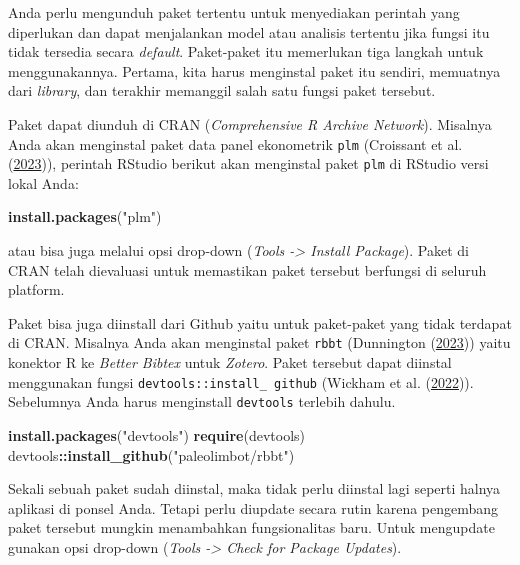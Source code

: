 \documentclass[a4paper, nobind]{templates/ociamthesis}
\newenvironment{Shaded}{\begin{snugshade}}{\end{snugshade}}
\newcommand{\FunctionTok}[1]{\textcolor[rgb]{0.13,0.29,0.53}{\textbf{#1}}}
\newcommand{\NormalTok}[1]{#1}
\newcommand{\SpecialCharTok}[1]{\textcolor[rgb]{0.81,0.36,0.00}{\textbf{#1}}}
\newcommand{\StringTok}[1]{\textcolor[rgb]{0.31,0.60,0.02}{#1}}
\renewenvironment{Shaded}
{
  \vspace{10pt}%
  \begin{snugshade}%
}{%
  \end{snugshade}%
  \vspace{8pt}%
}
\begin{document}
Anda perlu mengunduh paket tertentu untuk menyediakan perintah yang diperlukan dan dapat menjalankan model atau analisis tertentu jika fungsi itu tidak tersedia secara \emph{default}. Paket-paket itu memerlukan tiga langkah untuk menggunakannya. Pertama, kita harus menginstal paket itu sendiri, memuatnya dari \emph{library}, dan terakhir memanggil salah satu fungsi paket tersebut.

Paket dapat diunduh di CRAN (\emph{Comprehensive R Archive Network}). Misalnya Anda akan menginstal paket data panel ekonometrik \texttt{plm} (Croissant et al. (\protect\hyperlink{ref-croissantPlmLinearModels2023}{2023})), perintah RStudio berikut akan menginstal paket \texttt{plm} di RStudio versi lokal Anda:

\begin{Shaded}
\begin{Highlighting}[]
\FunctionTok{install.packages}\NormalTok{(}\StringTok{"plm"}\NormalTok{)}
\end{Highlighting}
\end{Shaded}

atau bisa juga melalui opsi drop-down (\emph{Tools -\textgreater{} Install Package}). Paket di CRAN telah dievaluasi untuk memastikan paket tersebut berfungsi di seluruh platform.

Paket bisa juga diinstall dari Github yaitu untuk paket-paket yang tidak terdapat di CRAN. Misalnya Anda akan menginstal paket \texttt{rbbt} (Dunnington (\protect\hyperlink{ref-dunningtonPaleolimbotRbbt2023}{2023})) yaitu konektor R ke \emph{Better Bibtex} untuk \emph{Zotero}. Paket tersebut dapat diinstal menggunakan fungsi \texttt{devtools::install\_\ github} (Wickham et al. (\protect\hyperlink{ref-wickhamDevtoolsToolsMake2022}{2022})). Sebelumnya Anda harus menginstall \texttt{devtools} terlebih dahulu.

\begin{Shaded}
\begin{Highlighting}[]
\FunctionTok{install.packages}\NormalTok{(}\StringTok{"devtools"}\NormalTok{)}
\FunctionTok{require}\NormalTok{(devtools)}
\NormalTok{devtools}\SpecialCharTok{::}\FunctionTok{install\_github}\NormalTok{(}\StringTok{"paleolimbot/rbbt"}\NormalTok{)}
\end{Highlighting}
\end{Shaded}

Sekali sebuah paket sudah diinstal, maka tidak perlu diinstal lagi seperti halnya aplikasi di ponsel Anda. Tetapi perlu diupdate secara rutin karena pengembang paket tersebut mungkin menambahkan fungsionalitas baru. Untuk mengupdate gunakan opsi drop-down (\emph{Tools -\textgreater{} Check for Package Updates}).
\end{document}
